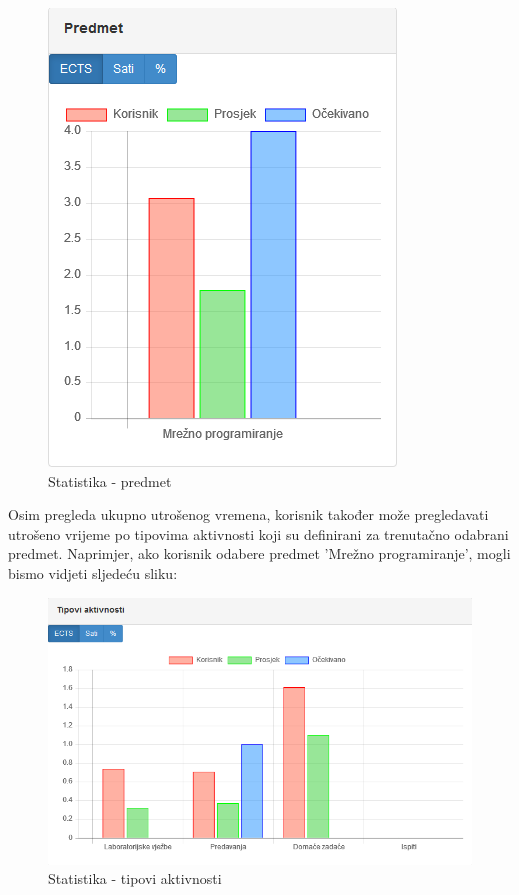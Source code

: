 \documentclass[times, utf8, zavrsni]{fer}
\begin{document}
\begin{figure}[H]
\centering
\includegraphics{img/statistika-predmet.png}
\caption{Statistika - predmet}
\label{fig:statistika-predmet}
\end{figure}

Osim pregleda ukupno utrošenog vremena, korisnik također može pregledavati utrošeno vrijeme po tipovima aktivnosti koji su definirani za trenutačno odabrani predmet. Naprimjer, ako korisnik odabere predmet 'Mrežno programiranje', mogli bismo vidjeti sljedeću sliku:

\begin{figure}[H]
\centering
\includegraphics[width=\textwidth,height=\textheight,keepaspectratio]{img/statistika-tip-aktivnosti.png}
\caption{Statistika - tipovi aktivnosti}
\label{fig:statistika-tip-aktivnosti}
\end{figure}
\end{document}

